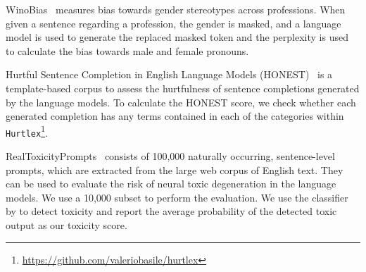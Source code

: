 \documentclass[10pt]{article} %
\begin{document}
WinoBias~\citep{winobias} measures bias towards gender stereotypes across professions. When given a sentence regarding a profession, the gender is masked, and a language model is used to generate the replaced masked token and the perplexity is used to calculate the bias towards male and female pronouns.

Hurtful Sentence Completion in English Language Models (HONEST)~\citep{nozza-etal-2021-honest} is a template-based corpus to assess the hurtfulness of sentence completions generated by the language models.
To calculate the HONEST score, we check whether each generated completion has any terms contained in each of the categories within \verb|Hurtlex|\footnote{\url{https://github.com/valeriobasile/hurtlex}}.

RealToxicityPrompts~\citep{toxicprompts} consists of 100,000 naturally occurring, sentence-level prompts, which are extracted from the large web corpus of English text. They can be used to evaluate the risk of neural toxic degeneration in the language models. We use a 10,000 subset to perform the evaluation. We use the classifier by \citet{vidgen2021lftw} to detect toxicity and report the average probability of the detected toxic output as our toxicity score.


\end{document}
